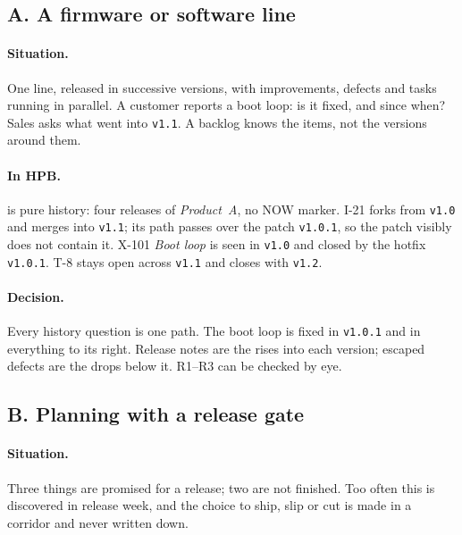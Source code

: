 \subsection{A. A firmware or software line}
\label{sec:cond-software}



\paragraph{Situation.}
One line, released in successive versions, with improvements, defects and
tasks running in parallel. A customer reports a boot loop: is it fixed, and
since when? Sales asks what went into \texttt{v1.1}. A backlog knows the
items, not the versions around them.

\paragraph{In HPB.}
 is pure history: four releases of
\emph{Product~A}, no NOW marker. I-21 forks from \texttt{v1.0} and merges
into \texttt{v1.1}; its path passes over the patch \texttt{v1.0.1}, so the
patch visibly does not contain it. X-101 \emph{Boot loop} is seen in
\texttt{v1.0} and closed by the hotfix \texttt{v1.0.1}. T-8 stays open
across \texttt{v1.1} and closes with \texttt{v1.2}.

\paragraph{Decision.}
Every history question is one path. The boot loop is fixed in
\texttt{v1.0.1} and in everything to its right. Release notes are the
rises into each version; escaped defects are the drops below it. R1--R3
can be checked by eye.

\subsection{B. Planning with a release gate}
\label{sec:cond-gate}



\paragraph{Situation.}
Three things are promised for a release; two are not finished. Too often
this is discovered in release week, and the choice to ship, slip or cut is
made in a corridor and never written down.


